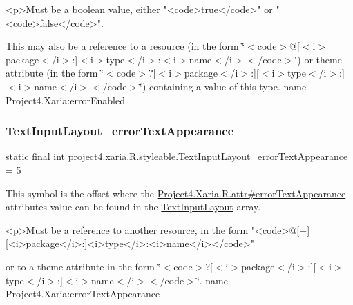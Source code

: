 \begin{DoxyVerb}      <p>Must be a boolean value, either "<code>true</code>" or "<code>false</code>".
\end{DoxyVerb}
 

This may also be a reference to a resource (in the form \char`\"{}$<$code$>$@\mbox{[}$<$i$>$package$<$/i$>$\+:\mbox{]}$<$i$>$type$<$/i$>$\+:$<$i$>$name$<$/i$>$$<$/code$>$\char`\"{}) or theme attribute (in the form \char`\"{}$<$code$>$?\mbox{[}$<$i$>$package$<$/i$>$\+:\mbox{]}\mbox{[}$<$i$>$type$<$/i$>$\+:\mbox{]}$<$i$>$name$<$/i$>$$<$/code$>$\char`\"{}) containing a value of this type.  name Project4.\+Xaria\+:error\+Enabled \mbox{\label{classproject4_1_1xaria_1_1R_1_1styleable_ad38bee143dd17467370cd16a83428514}} 
\subsubsection{\texorpdfstring{Text\+Input\+Layout\+\_\+error\+Text\+Appearance}{TextInputLayout\_errorTextAppearance}}
{\footnotesize\ttfamily static final int project4.\+xaria.\+R.\+styleable.\+Text\+Input\+Layout\+\_\+error\+Text\+Appearance = 5\hspace{0.3cm}{\ttfamily [static]}}

This symbol is the offset where the \hyperlink{}{Project4.\+Xaria.\+R.\+attr\#error\+Text\+Appearance} attribute\textquotesingle{}s value can be found in the \hyperlink{classproject4_1_1xaria_1_1R_1_1styleable_a5a2e4611c17d75c805194b416b9fed74}{Text\+Input\+Layout} array.

\begin{DoxyVerb}      <p>Must be a reference to another resource, in the form "<code>@[+][<i>package</i>:]<i>type</i>:<i>name</i></code>"
\end{DoxyVerb}
 or to a theme attribute in the form \char`\"{}$<$code$>$?\mbox{[}$<$i$>$package$<$/i$>$\+:\mbox{]}\mbox{[}$<$i$>$type$<$/i$>$\+:\mbox{]}$<$i$>$name$<$/i$>$$<$/code$>$\char`\"{}.  name Project4.\+Xaria\+:error\+Text\+Appearance \mbox{\label{classproject4_1_1xaria_1_1R_1_1styleable_a54817cff7e70ea97df2faf7653859bd4}} 
